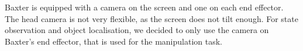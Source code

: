 Baxter is equipped with a camera on the screen and one on each end effector.
The head camera is not very flexible, as the screen does not tilt enough.
For state observation and object localisation, we decided to only use the camera on Baxter's end effector, that is used for the manipulation task.



